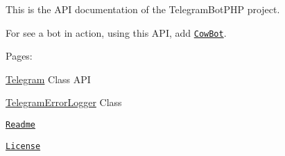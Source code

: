 This is the A\-P\-I documentation of the Telegram\-Bot\-P\-H\-P project.\par
 For see a bot in action, using this A\-P\-I, add \href{https://telegram.me/cowmooobot}{\tt Cow\-Bot}.\par
 Pages\-:\par
 \hyperlink{class_telegram}{Telegram} Class A\-P\-I \par
 \hyperlink{class_telegram_error_logger}{Telegram\-Error\-Logger} Class\par
 \href{md__home_travis_build__eleirbag89__telegram_bot_p_h_p__r_e_a_d_m_e.html}{\tt Readme}\par
 \href{md__home_travis_build__eleirbag89__telegram_bot_p_h_p__l_i_c_e_n_s_e.html}{\tt License} 